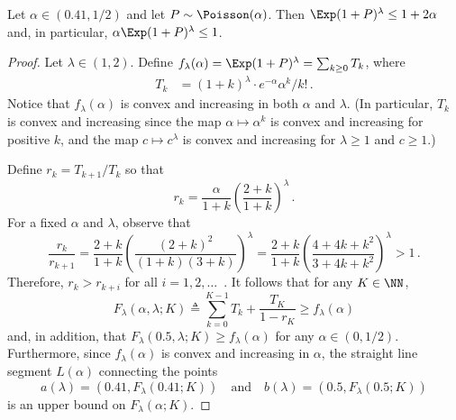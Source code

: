     \begin{proposition}\label{prop:poisson-moment}
        Let $\alpha \in (0.41, 1/2)$ and 
        let $P \sim \Poisson(\alpha)$. 
        Then $\Exp (1 + P)^\lambda \leq 1 + 2 \alpha$ and, 
        in particular, $\alpha \Exp (1 + P)^\lambda \leq 1$.
    \end{proposition}
    \begin{proof}
        Let $\lambda \in (1, 2)$. 
        Define $f_\lambda(\alpha) = \Exp (1 + P)^\lambda = \sum_{k \geq 0} T_k$, where 
        \begin{align*}
            T_k &= (1 + k)^\lambda \cdot e^{-\alpha} \alpha^k/k!
            \,.
        \end{align*} 
        Notice that $f_\lambda(\alpha)$ is convex and increasing in both $\alpha$ and $\lambda$. 
        (In particular, $T_k$  is convex and increasing since 
        the map $\alpha \mapsto \alpha^k$ is convex and increasing for positive $k$, 
        and the map $c \mapsto c^\lambda$ is convex and increasing for $\lambda \geq 1$ and $c \geq 1$.)

        Define $r_k = T_{k+1}/T_k$ so that 
        $$
            r_k = \frac{\alpha}{1+k} \left(\frac{2 + k}{1 + k}\right)^\lambda
            \,.
        $$ 
        For a fixed $\alpha$ and $\lambda$, observe that 
        $$\frac{r_k}{r_{k+1}} 
        = \frac{2 + k}{1 + k} \left(\frac{(2 + k)^2}{(1+k)(3 + k)} \right)^\lambda
        = \frac{2 + k}{1 + k} \left(\frac{4 + 4k + k^2}{3 + 4k + k^2} \right)^\lambda
        > 1
        \,.
        $$
        Therefore, $r_k > r_{k+i}$ for all $i = 1, 2, \ldots$\ .
        It follows that for any $K \in \NN$, 
        $$
            F_\lambda(\alpha, \lambda; K) 
            \triangleq \sum_{k = 0}^{K-1} T_k + \frac{T_K}{1 - r_K} 
            \geq f_\lambda(\alpha)
        $$
        and, in addition, that $F_\lambda(0.5, \lambda; K) \geq f_\lambda(\alpha)$ for any $\alpha \in (0, 1/2)$.
        Furthermore, since $f_\lambda(\alpha)$ is convex and increasing in $\alpha$,  
        the straight line segment $L(\alpha)$ connecting the points 
        $$
        a(\lambda) = \left(0.41, F_\lambda(0.41; K) \right)
        \quad\text{and}\quad
        b(\lambda) = \left(0.5, F_\lambda(0.5; K) \right)
        $$ is an upper bound on $F_\lambda(\alpha; K)$. 


\end{proof}
